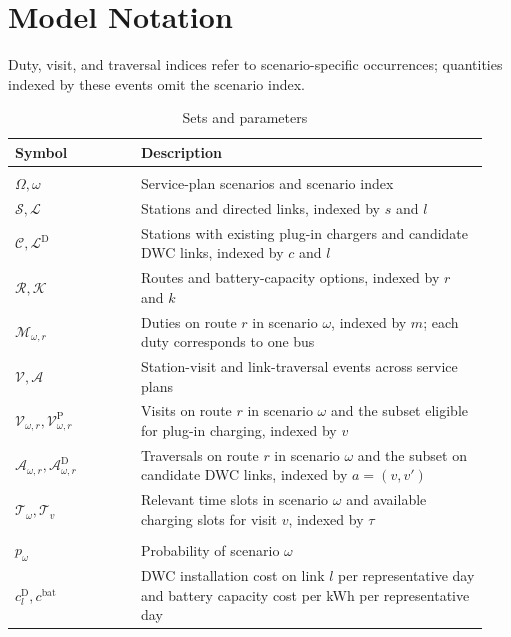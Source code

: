 \FloatBarrier
\section{Model Notation}
\label{app:model-details}

Duty, visit, and traversal indices refer to scenario-specific occurrences; quantities indexed by these events omit the scenario index.

\begin{table}[htbp]
\centering
\footnotesize
\setlength{\tabcolsep}{3pt}
\renewcommand{\arraystretch}{1.0}
\caption{Sets and parameters}
\label{tab:notation}
\begin{tabular}{@{}>{\raggedright\arraybackslash}p{0.25\linewidth}>{\raggedright\arraybackslash}p{0.69\linewidth}@{}}
\toprule
\textbf{Symbol} & \textbf{Description} \\
\midrule
\multicolumn{2}{@{}l}{\textit{Sets and indices}} \\
$\Omega,\omega$ & Service-plan scenarios and scenario index \\
$\mathcal S,\mathcal L$ & Stations and directed links, indexed by $s$ and $l$ \\
$\mathcal C,\mathcal L^{\mathrm D}$ & Stations with existing plug-in chargers and candidate DWC links, indexed by $c$ and $l$ \\
$\mathcal R,\mathcal K$ & Routes and battery-capacity options, indexed by $r$ and $k$ \\
$\mathcal M_{\omega,r}$ & Duties on route $r$ in scenario $\omega$, indexed by $m$; each duty corresponds to one bus \\
$\mathcal V,\mathcal A$ & Station-visit and link-traversal events across service plans \\
$\mathcal V_{\omega,r},\mathcal V^{\mathrm P}_{\omega,r}$ & Visits on route $r$ in scenario $\omega$ and the subset eligible for plug-in charging, indexed by $v$ \\
$\mathcal A_{\omega,r},\mathcal A^{\mathrm D}_{\omega,r}$ & Traversals on route $r$ in scenario $\omega$ and the subset on candidate DWC links, indexed by $a=(v,v')$ \\
$\mathcal T_\omega,\mathcal T_v$ & Relevant time slots in scenario $\omega$ and available charging slots for visit $v$, indexed by $\tau$ \\
\addlinespace
\multicolumn{2}{@{}l}{\textit{Parameters}} \\
$p_\omega$ & Probability of scenario $\omega$ \\
$c_l^{\mathrm D},c^{\mathrm{bat}}$ & DWC installation cost on link $l$ per representative day and battery capacity cost per kWh per representative day \\

\end{tabular}
\end{table}
